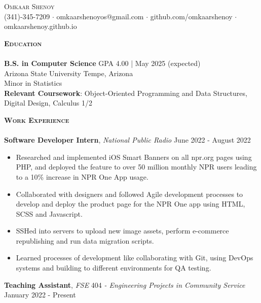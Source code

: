 \documentclass[10pt, a4paper]{article}
\newcommand{\lineunder} {
    \vspace*{-8pt} \\
    \hspace*{-18pt} \hrulefill \\
}
\newcommand{\header} [1] {
    {\hspace*{-15pt}\vspace*{3pt} \textsc{#1}}
    \vspace*{-6pt} \lineunder
}
\begin{document}
{\begin{center}
    
	{\Huge \scshape {Omkaar Shenoy}}\\  
	\vspace{2mm}
	(341)-345-7209 $\cdot$ omkaarshenoyos@gmail.com $\cdot$ github.com/omkaarshenoy  $\cdot$ omkaarshenoy.github.io
	
\end{center}



    \header{\textbf{Education}}

    \textbf{B.S. in Computer Science}  \hfill GPA 4.00 | May 2025 (expected)
    \\ Arizona State University \hfill Tempe, Arizona
\\Minor in Statistics \\
\textbf{Relevant Coursework}: Object-Oriented Programming and Data Structures, Digital Design, Calculus 1/2 \\


\vspace{2mm}




    \header{\textbf{Work Experience}}
    \textbf{Software Developer Intern}, \textit{National Public Radio}     \hfill June 2022 - August 2022\\
    \vspace{-2mm}
\begin{itemize}
    \itemsep-0.05em
    \item Researched and implemented iOS Smart Banners on all npr.org pages using PHP, and deployed the feature to over 50 million monthly NPR users leading to a 10\% increase in NPR One App usage. 
    \item Collaborated with designers and followed Agile development processes to develop and deploy the product page for the NPR One app using HTML, SCSS and Javascript. 
    \item SSHed into servers to upload new image assets, perform e-commerce republishing and run data migration scripts. 
    \item Learned processes of development like collaborating with Git, using DevOps systems and building to different environments for QA testing.
\end{itemize}

    \textbf{Teaching Assistant}, \textit{FSE} 404 \textit{- Engineering Projects in Community Service} \hfill January 2022 - Present\\
      
}
\end{document}
